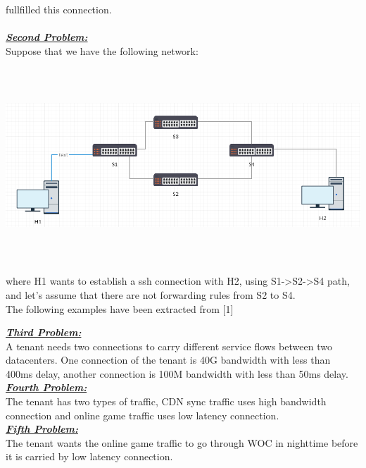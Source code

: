 \documentclass[envcountsect,runningheads]{llncs}
\begin{document}
fullfilled this connection. \\
\\
\textbf{\underline{\textit{Second Problem:}}} \\
Suppose that we have the following network:\\
\includegraphics[width=\textwidth, height=8cm]{second_example.png}\\
where H1 wants to establish a ssh connection with H2, using S1->S2->S4 path, and 
let's assume that there are not forwarding rules from S2 to S4. 
\\

The following examples have been extracted from [1]

\textbf{\underline{\textit{Third Problem:}}} \\
A tenant needs two connections to carry different service flows between two datacenters.
One connection of the tenant is 40G bandwidth with less than 400ms delay, another 
connection is 100M bandwidth with less than 50ms delay.\\

\textbf{\underline{\textit{Fourth Problem:}}} \\
The tenant has two types of traffic, CDN sync traffic uses high bandwidth connection and online 
game traffic uses low latency connection.\\

\textbf{\underline{\textit{Fifth Problem:}}} \\
The tenant wants the online game traffic to go through WOC in nighttime before it is carried by 
low latency connection.\\
\end{document}
